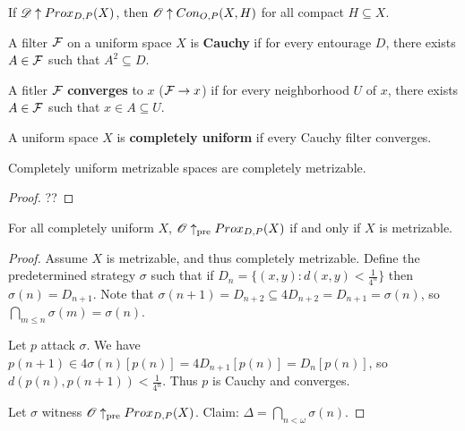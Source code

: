 \begin{corollary}
  If $\mathscr{D} \uparrow Prox_{D,P}(X)$, then $\mathscr{O}\uparrow Con_{O,P}(X,H)$ for all compact $H\subseteq X$.
\end{corollary}








\newpage

\begin{definition}
  A filter $\mathcal{F}$ on a uniform space $X$ is \textbf{Cauchy} if for every entourage $D$, there exists $A\in \mathcal{F}$ such that $A^2\subseteq D$.
\end{definition}

\begin{definition}
  A fitler $\mathcal{F}$ \textbf{converges} to $x$ ($\mathcal{F}\to x$) if for every neighborhood $U$ of $x$, there exists $A\in \mathcal{F}$ such that $x\in A\subseteq U$.
\end{definition}

\begin{definition}
  A uniform space $X$ is \textbf{completely uniform} if every Cauchy filter converges.
\end{definition}

\begin{proposition}
  Completely uniform metrizable spaces are completely metrizable.
\end{proposition}

\begin{proof}
  ??
\end{proof}

\begin{theorem}
For all completely uniform $X$, $\mathscr{O} \uparrow_{\text{pre}}Prox_{D,P}(X)$ if and only if $X$ is metrizable.
\end{theorem}

\begin{proof}
  Assume $X$ is metrizable, and thus completely metrizable. Define the predetermined strategy $\sigma$ such that if $D_n=\{(x,y):d(x,y)<\frac{1}{4^n}\}$ then $\sigma(n)=D_{n+1}$. Note that $\sigma(n+1)=D_{n+2}\subseteq 4D_{n+2}= D_{n+1} =\sigma(n)$, so $\bigcap_{m\leq n}\sigma(m)=\sigma(n)$. 

  Let $p$ attack $\sigma$. We have $p(n+1)\in 4\sigma(n)[p(n)]=4D_{n+1}[p(n)]=D_n[p(n)]$, so $d(p(n),p(n+1))<\frac{1}{4^n}$. Thus $p$ is Cauchy and converges.

  Let $\sigma$ witness $\mathscr{O} \uparrow_{\text{pre}}Prox_{D,P}(X)$. Claim: $\Delta = \bigcap_{n<\omega}\sigma(n)$.
\end{proof}





















